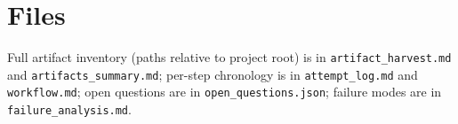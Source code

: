 \documentclass[11pt]{article}
\begin{document}
\section{Files}

Full artifact inventory (paths relative to project root) is in \texttt{artifact\_harvest.md}
and \texttt{artifacts\_summary.md}; per-step chronology is in \texttt{attempt\_log.md} and
\texttt{workflow.md}; open questions are in \texttt{open\_questions.json}; failure modes are in
\texttt{failure\_analysis.md}.
\end{document}
